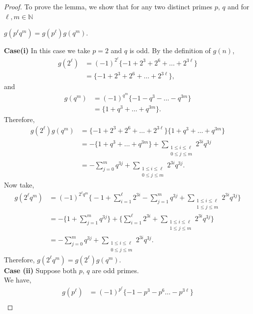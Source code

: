 \documentclass[preprint,12pt]{elsarticle}
\numberwithin{equation}{section}
\begin{document}
\begin{proof}
	To prove the lemma, we show that for any two distinct primes $p,\,q$ and for $\ell,m \in \mathbb{N}$
	\begin{center}
		$g(p^{\ell}q^{m})=g(p^{\ell})g(q^{m})$.
	\end{center}
	\textbf{Case(i)} In this case we take $p=2$ and $q$ is odd. By the definition of $g(n)$,
	\begin{align*}
		g(2^{\ell})&=(-1)^{2^{\ell}}\{-1+2^{3}+2^{6}+\dots+2^{3\ell}\}\\
		&=\{-1+2^{3}+2^{6}+\dots+2^{3\ell}\},
	\end{align*}
	and 
	\begin{align*}
		g(q^{m})&=(-1)^{q^{m}}\{-1-q^{3}-\dots-q^{3m}\}\\
		&=\{1+q^{3}+\dots+q^{3m}\}.
	\end{align*}
	Therefore,
	\begin{align*}
		g(2^{\ell})g(q^{m})&=\{-1+2^{3}+2^{6}+\dots+2^{3\ell}\}\{1+q^{3}+\dots+q^{3m}\}\\
		&=-\{1+q^{3}+\dots+q^{3m}\}+\sum\limits_{\substack{1\leq i\leq \ell \\ 0\leq j \leq m}} 2^{3i} q^{3j}\\
		&=-\sum\limits_{j=0}^{m}q^{3j}+\sum\limits_{\substack{1\leq i\leq \ell \\ 0\leq j \leq m}} 2^{3i} q^{3j}.
	\end{align*}
	Now take,
	\begin{align*}
		g(2^{\ell}q^{m})&=(-1)^{2^{\ell}q^{m}}\big\{-1+\sum\limits_{i=1}^{\ell}2^{3i}-\sum\limits_{j=1}^{m}q^{3j}+\sum\limits_{\substack{1\leq i\leq \ell \\ 1\leq j \leq m}} 2^{3i} q^{3j}\big\}\\
		&=-\big\{1+\sum\limits_{j=1}^{m}q^{3j}\big\}+\big\{\sum\limits_{i=1}^{\ell}2^{3i}+ \sum\limits_{\substack{1\leq i\leq \ell \\ 1\leq j \leq m}} 2^{3i} q^{3j}\big\}\\
		&=-\sum\limits_{j=0}^{m}q^{3j}+\sum\limits_{\substack{1\leq i\leq \ell \\ 0\leq j \leq m}} 2^{3i} q^{3j}.
	\end{align*}
	Therefore, $g(2^{\ell}q^{m})=g(2^{\ell})g(q^{m})$.\vspace{3mm}\\
	\textbf{Case (ii)} Suppose both $p,\,q$ are odd primes.\\
	We have,
	\begin{align*}
		g(p^{\ell})&=(-1)^{p^{\ell}}\{-1-p^{3}-p^{6}\dots-p^{3\ell}\}\\

\end{align*}
\end{proof}
\end{document}
